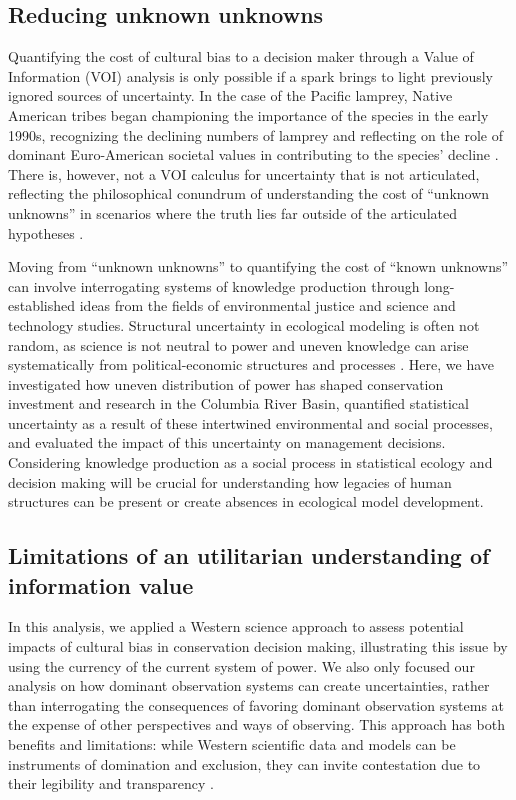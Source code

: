 \documentclass{article}
\begin{document}
\subsection*{Reducing unknown unknowns}

Quantifying the cost of cultural bias to a decision maker through a Value of Information (VOI) analysis is only possible if a spark brings to light previously ignored sources of uncertainty. In the case of the Pacific lamprey, Native American tribes began championing the importance of the species in the early 1990s, recognizing the declining numbers of lamprey and reflecting on the role of dominant Euro-American societal values in contributing to the species' decline \parencite{clemens2017conservation, close2002ecological, close2004traditional}. There is, however, not a VOI calculus for uncertainty that is not articulated, reflecting the philosophical conundrum of understanding the cost of “unknown unknowns” in scenarios where the truth lies far outside of the articulated hypotheses \parencite{wintle2010allocating}.

Moving from “unknown unknowns” to quantifying the cost of “known unknowns” can involve interrogating systems of knowledge production through long-established ideas from the fields of environmental justice and science and technology studies. Structural uncertainty in ecological modeling is often not random, as science is not neutral to power and uneven knowledge can arise systematically from political-economic structures and processes \parencite{silver2022fish, bloor2004sociology}. Here, we have investigated how uneven distribution of power has shaped conservation investment and research in the Columbia River Basin, quantified statistical uncertainty as a result of these intertwined environmental and social processes, and evaluated the impact of this uncertainty on management decisions. Considering knowledge production as a social process in statistical ecology and decision making will be crucial for understanding how legacies of human structures can be present or create absences in ecological model development.


\subsection*{Limitations of an utilitarian understanding of information value}

In this analysis, we applied a Western science approach to assess potential impacts of cultural bias in conservation decision making, illustrating this issue by using the currency of the current system of power. We also only focused our analysis on how dominant observation systems can create uncertainties, rather than interrogating the consequences of favoring dominant observation systems at the expense of other perspectives and ways of observing. This approach has both benefits and limitations: while Western scientific data and models can be instruments of domination and exclusion, they can invite contestation due to their legibility and transparency \parencite{peluso1995whose, scoville2025maps}.
\end{document}
